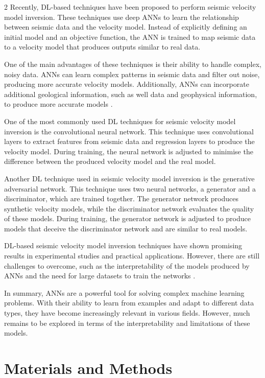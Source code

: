 \documentclass[a4paper,twoside,12pt]{article}
\begin{document}
\begin{multicols}{2}
Recently, DL-based techniques have been proposed to perform seismic velocity model inversion. These techniques use deep ANNs to learn the relationship between seismic data and the velocity model. Instead of explicitly defining an initial model and an objective function, the ANN is trained to map seismic data to a velocity model that produces outputs similar to real data.

One of the main advantages of these techniques is their ability to handle complex, noisy data. ANNs can learn complex patterns in seismic data and filter out noise, producing more accurate velocity models. Additionally, ANNs can incorporate additional geological information, such as well data and geophysical information, to produce more accurate models \cite{10}.

One of the most commonly used DL techniques for seismic velocity model inversion is the convolutional neural network. This technique uses convolutional layers to extract features from seismic data and regression layers to produce the velocity model. During training, the neural network is adjusted to minimise the difference between the produced velocity model and the real model.

Another DL technique used in seismic velocity model inversion is the generative adversarial network. This technique uses two neural networks, a generator and a discriminator, which are trained together. The generator network produces synthetic velocity models, while the discriminator network evaluates the quality of these models. During training, the generator network is adjusted to produce models that deceive the discriminator network and are similar to real models.

DL-based seismic velocity model inversion techniques have shown promising results in experimental studies and practical applications. However, there are still challenges to overcome, such as the interpretability of the models produced by ANNs and the need for large datasets to train the networks \cite{11}.

In summary, ANNs are a powerful tool for solving complex machine learning problems. With their ability to learn from examples and adapt to different data types, they have become increasingly relevant in various fields. However, much remains to be explored in terms of the interpretability and limitations of these models.

\section{Materials and Methods}


\end{multicols}
\end{document}

